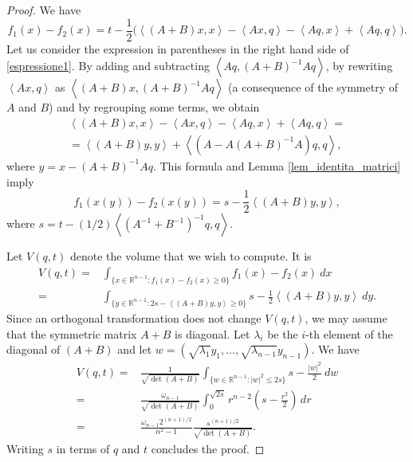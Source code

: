 \documentclass[a4paper]{amsart}
\theoremstyle{definition}
\numberwithin{equation}{section}
\begin{document}
\begin{proof}
We have
\begin{equation}\label{espressione1}
f_1(x)-f_2(x)=t-\frac{1}{2}\Big( \left<(A+B)x, x\right>-\left<Ax, q\right>-\left<Aq, x\right>+\left<Aq, q\right> \Big).
\end{equation}
Let us consider the expression  in parentheses in the right hand side of \eqref{espressione1}. By adding and subtracting $\left<Aq, (A+B)^{-1}Aq\right>$, by rewriting $\left<Ax, q\right>$ as $\left<(A+B)x,(A+B)^{-1}Aq\right>$ (a consequence of the symmetry of $A$ and $B$) and by regrouping some terms, we  obtain
\begin{multline*}
 \left<(A+B)x, x\right>-\left<Ax, q\right>-\left<Aq, x\right>+\left<Aq, q\right>=\\
 =\left<(A+B)y, y\right>+\left<\left(A-A(A+B)^{-1}A\right)q, q\right>,
\end{multline*}
where $y=x-(A+B)^{-1}Aq$.  This formula and Lemma \ref{lem_identita_matrici} imply
\[
  f_1(x(y))-f_2(x(y))=s-\frac1{2}\left<(A+B)y, y\right>,
\]
where  $s=t-(1/2)\left<\left(A^{-1}+B^{-1}\right)^{-1}q, q\right>$.

Let $V(q,t)$ denote the volume that we wish to compute. It is
\begin{align*}
 V(q,t)
=&\int_{\{x\in{\mathbb{R}}^{n-1} : f_1(x)-f_2(x)\geq0\}}f_1(x)-f_2(x)\ dx\\
=&\int_{\{y\in{\mathbb{R}}^{n-1} : 2s-\left<(A+B)y, y\right>\geq0\}}s-\frac1{2}\left<(A+B)y, y\right>\ dy.
\end{align*}
Since  an orthogonal transformation does not change $V(q,t)$, we may assume that the symmetric matrix $A+B$ is diagonal. Let ${{\lambda}}_i$ be the $i$-th element of the diagonal of $(A+B)$ and let $w=(\sqrt{{{\lambda}}_1}y_1,\dots,\sqrt{{{\lambda}}_{n-1}}y_{n-1})$. We have
\begin{align*}
 V(q,t)
=&\frac1{\sqrt{\det(A+B)}}\int_{\{w\in{\mathbb{R}}^{n-1}:|w|^2\leq 2s\}}s-\frac{|w|^2}{2}\ dw\\
=&\frac{\omega_{n-1}}{\sqrt{\det(A+B)}}\int_0^{\sqrt{2s}}r^{n-2}\left(s-\frac{r^2}2\right)\,dr\\
=&\frac{\omega_{n-1} 2^{(n+1)/2}}{n^2-1} \frac{s^{(n+1)/2}}{\sqrt{\det(A+B)}}.
\end{align*}
Writing $s$ in terms of $q$ and $t$ concludes the proof.
\end{proof}
\end{document}
